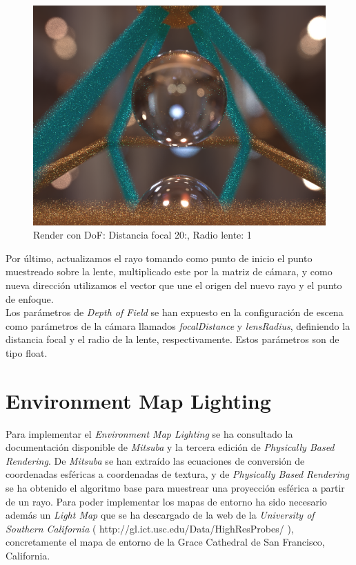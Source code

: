 \documentclass[10pt,oneside,a4paper]{article}
\begin{document}
\begin{figure}[h]
\centering
\includegraphics[width=1\linewidth]{images/escena_2400x1800_128spp_dof20-1_screencap.png}
\caption{Render con DoF: Distancia focal 20:, Radio lente: 1}
\label{fig:disp}
\end{figure}

Por último, actualizamos el rayo tomando como punto de inicio el punto muestreado sobre la lente, multiplicado este por la matriz de cámara, y como nueva dirección utilizamos el vector que une el origen del nuevo rayo y el punto de enfoque.\\

Los parámetros de \emph{Depth of Field} se han expuesto en la configuración de escena como parámetros de la cámara llamados \emph{focalDistance} y \emph{lensRadius}, definiendo la distancia focal y el radio de la lente, respectivamente. Estos parámetros son de tipo float.

\newpage

\section{Environment Map Lighting}
Para implementar el \emph{Environment Map Lighting} se ha consultado la documentación disponible de \emph{Mitsuba} y la tercera edición de \emph{Physically Based Rendering}. De \emph{Mitsuba} se han extraído las ecuaciones de conversión de coordenadas esféricas a coordenadas de textura, y de \emph{Physically Based Rendering} se ha obtenido el algoritmo base para muestrear una proyección esférica a partir de un rayo. Para poder implementar los mapas de entorno ha sido necesario además un \emph{Light Map} que se ha descargado de la web de la \emph{University of Southern California} ( http://gl.ict.usc.edu/Data/HighResProbes/ ), concretamente el mapa de entorno de la Grace Cathedral de San Francisco, California.\\
\end{document}
